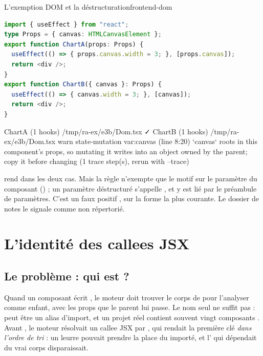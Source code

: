 \begin{exemple}{L'exemption DOM et la déstructuration}{frontend-dom}
\begin{lstlisting}[language=TypeScript,caption={\file{/tmp/ra-ex/e3b/Dom.tsx}}]
import { useEffect } from "react";
type Props = { canvas: HTMLCanvasElement };
export function ChartA(props: Props) {
  useEffect(() => { props.canvas.width = 3; }, [props.canvas]);
  return <div />;
}
export function ChartB({ canvas }: Props) {
  useEffect(() => { canvas.width = 3; }, [canvas]);
  return <div />;
}
\end{lstlisting}
\begin{sortie}
  ChartA  (1 hooks)  /tmp/ra-ex/e3b/Dom.tsx  ✓
  ChartB  (1 hooks)  /tmp/ra-ex/e3b/Dom.tsx
    warn   state-mutation  var:canvas  (line 8:20)  `canvas` roots in this component's props, so mutating it writes into an object owned by the parent; copy it before changing
       (1 trace step(s), rerun with --trace)
\end{sortie}
 rend  dans les deux cas. Mais la règle n'exempte que le motif  sur le paramètre du composant () ; un paramètre déstructuré s'appelle , et  y est lié par le préambule de paramètres. C'est un faux positif \Warning{}, sur la forme la plus courante. Le dossier de notes le signale comme non répertorié.
\end{exemple}

\section{L'identité des callees JSX}
\label{sec:frontend-jsx}

\subsection{Le problème : qui est  ?}

Quand un composant écrit , le moteur doit trouver le corps de  pour l'analyser comme enfant, avec les props que le parent lui passe. Le nom seul ne suffit pas :  peut être un alias d'import, et un projet réel contient souvent vingt composants . Avant , le moteur résolvait un callee JSX par , qui rendait la première clé  \emph{dans l'ordre de tri} : un leurre  pouvait prendre la place du  importé, et l'\Error{} qui dépendait du vrai corps disparaissait.

